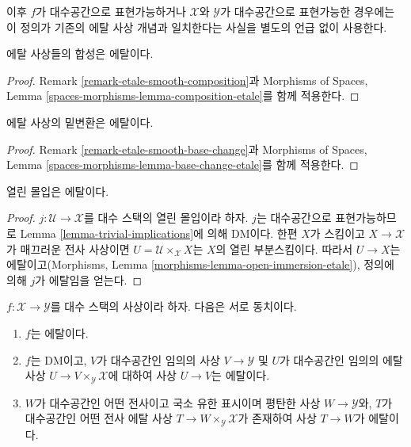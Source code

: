 \noindent
이후 $f$가 대수공간으로 표현가능하거나 $\mathcal{X}$와 $\mathcal{Y}$가
대수공간으로 표현가능한 경우에는 이 정의가 기존의 에탈 사상 개념과
일치한다는 사실을 별도의 언급 없이 사용한다.

\begin{lemma}
\label{lemma-composition-etale}
에탈 사상들의 합성은 에탈이다.
\end{lemma}

\begin{proof}
Remark \ref{remark-etale-smooth-composition}과 Morphisms of Spaces, Lemma
\ref{spaces-morphisms-lemma-composition-etale}를 함께 적용한다.
\end{proof}

\begin{lemma}
\label{lemma-base-change-etale}
에탈 사상의 밑변환은 에탈이다.
\end{lemma}

\begin{proof}
Remark \ref{remark-etale-smooth-base-change}과 Morphisms of Spaces, Lemma
\ref{spaces-morphisms-lemma-base-change-etale}를 함께 적용한다.
\end{proof}

\begin{lemma}
\label{lemma-open-immersion-etale}
열린 몰입은 에탈이다.
\end{lemma}

\begin{proof}
$j : \mathcal{U} \to \mathcal{X}$를 대수 스택의 열린 몰입이라 하자.
$j$는 대수공간으로 표현가능하므로 Lemma
\ref{lemma-trivial-implications}에 의해 DM이다. 한편 $X$가 스킴이고
$X \to \mathcal{X}$가 매끄러운 전사 사상이면
$U = \mathcal{U} \times_\mathcal{X} X$는 $X$의 열린 부분스킴이다.
따라서 $U \to X$는 에탈이고(Morphisms, Lemma
\ref{morphisms-lemma-open-immersion-etale}), 정의에 의해 $j$가 에탈임을
얻는다.
\end{proof}

\begin{lemma}
\label{lemma-etale}
$f : \mathcal{X} \to \mathcal{Y}$를 대수 스택의 사상이라 하자. 다음은
서로 동치이다.
\begin{enumerate}
\item $f$는 에탈이다.
\item $f$는 DM이고, $V$가 대수공간인 임의의 사상
$V \to \mathcal{Y}$ 및 $U$가 대수공간인 임의의 에탈 사상
$U \to V \times_\mathcal{Y} \mathcal{X}$에 대하여 사상 $U \to V$는
에탈이다.
\item $W$가 대수공간인 어떤 전사이고 국소 유한 표시이며 평탄한 사상
$W \to \mathcal{Y}$와, $T$가 대수공간인 어떤 전사 에탈 사상
$T \to W \times_\mathcal{Y} \mathcal{X}$가 존재하여 사상 $T \to W$가
에탈이다.
\end{enumerate}
\end{lemma}

